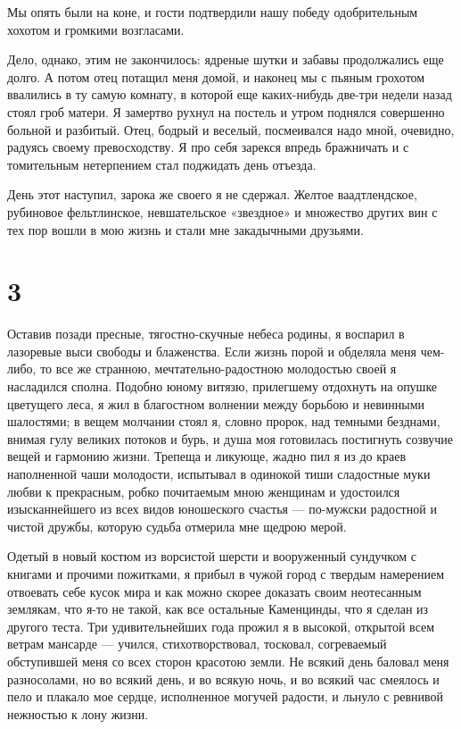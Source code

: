 Мы опять были  на коне, и гости подтвердили  нашу победу одобрительным
хохотом и громкими возгласами.

Дело, однако, этим не закончилось: ядреные шутки и забавы продолжались
еще долго.  А потом  отец потащил  меня домой, и  наконец мы  с пьяным
грохотом  ввалились в  ту самую  комнату, в  которой еще  каких-нибудь
две-три недели назад стоял гроб матери. Я замертво рухнул на постель и
утром поднялся совершенно больной и  разбитый. Отец, бодрый и веселый,
посмеивался надо  мной, очевидно, радуясь своему  превосходству. Я про
себя  зарекся  впредь  бражничать  и с  томительным  нетерпением  стал
поджидать день отъезда.

День  этот   наступил,  зарока   же  своего   я  не   сдержал.  Желтое
ваадтлендское,  рубиновое  фельтлинское,  невшательское  «звездное»  и
множество  других  вин  с тех  пор  вошли  в  мою  жизнь и  стали  мне
закадычными друзьями.


\section*{3}


Оставив позади  пресные, тягостно-скучные небеса родины,  я воспарил в
лазоревые выси свободы и блаженства.  Если жизнь порой и обделяла меня
чем-либо, то все же странною, мечтательно-радостною молодостью своей я
насладился  сполна.  Подобно  юному витязю,  прилегшему  отдохнуть  на
опушке цветущего  леса, я  жил в благостном  волнении между  борьбою и
невинными  шалостями; в  вещем молчании  стоял я,  словно пророк,  над
темными  безднами, внимая  гулу великих  потоков  и бурь,  и душа  моя
готовилась  постигнуть  созвучие вещей  и  гармонию  жизни. Трепеща  и
ликующе, жадно пил я из до краев наполненной чаши молодости, испытывал
в одинокой тиши  сладостные муки любви к  прекрасным, робко почитаемым
мною  женщинам и  удостоился изысканнейшего  из всех  видов юношеского
счастья  ---  по-мужски  радостной  и чистой  дружбы,  которую  судьба
отмерила мне щедрою мерой.

Одетый в  новый костюм из  ворсистой шерсти и вооруженный  сундучком с
книгами  и  прочими  пожитками,  я  прибыл в  чужой  город  с  твердым
намерением отвоевать себе кусок мира и как можно скорее доказать своим
неотесанным землякам, что я-то не такой, как все остальные Каменцинды,
что я  сделан из другого  теста. Три  удивительнейших года прожил  я в
высокой, открытой  всем ветрам мансарде ---  учился, стихотворствовал,
тосковал, согреваемый обступившей меня  со всех сторон красотою земли.
Не  всякий день  баловал меня  разносолами, но  во всякий  день, и  во
всякую ночь,  и во всякий  час смеялось и  пело и плакало  мое сердце,
исполненное  могучей радости,  и льнуло  с ревнивой  нежностью к  лону
жизни.


